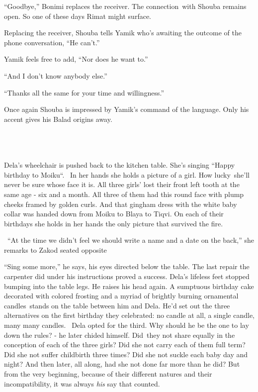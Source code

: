 \documentclass[twoside,11pt]{book}
\begin{document}
``Goodbye,'' Bonimi replaces the receiver. The connection~with Shouba remains open. So one of
these days Rimat might surface.

Replacing the receiver, Shouba tells Yamik who's awaiting the outcome of the phone conversation, ``He
can't.''

Yamik feels free to add, ``Nor does he want to.''

``And I don't know anybody else.''

``Thanks all the same for your time and willingness.''

Once again Shouba is impressed by Yamik's command of the language. Only his accent gives his Balad origins away.

~

\chapter{}

Dela's wheelchair is pushed back to the kitchen table. She's singing ``Happy birthday to
Moiku``. ~In her hands she holds a picture of a girl. How lucky~she'll never be sure whose face it is. All
three girls' lost their front left tooth at the same age - six and a month. All three of them had this round face with
plump cheeks framed by golden curls. And that gingham dress with the white baby collar was handed down from Moiku to
Blaya to Tiqvi. On each of their birthdays she holds in her hands the only picture that survived the fire.

\ ``At the time we didn't feel we should write a name and a date on the back,'' she remarks to
Zakod seated opposite

``Sing some more,'' he says, his eyes directed below the table. The last repair the carpenter
did under his instructions proved a success. Dela's lifeless feet stopped bumping into the table legs. He raises his
head again. A sumptuous birthday cake decorated with colored frosting and a myriad of brightly burning ornamental
candles~stands on the table between him and Dela. He'd set out the three alternatives on the first birthday they
celebrated: no candle at all, a single candle, many many candles.~ Dela opted for the third. Why should he be the one
to lay down the rules? - he later chided himself. Did~they not share equally in the conception of each of the three
girls? Did she not carry each of them full term? Did she not suffer childbirth three times? Did she not suckle each
baby day and night? And then later, all along, had she not done far more than he did? But from the very beginning,
because of their different natures and their incompatibility, it was always \textit{his} say that counted.
\end{document}

